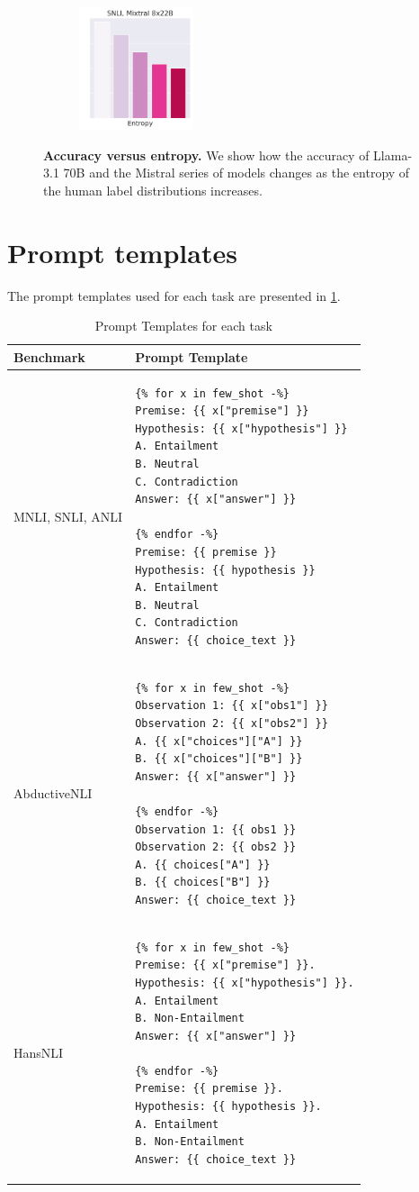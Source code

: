 \begin{figure}[t]
    \begin{subfigure}[b]{0.23\textwidth}
        \includegraphics[height=3.6cm]{figures/appendix/entropy_acc_snli_8x22B}
    \end{subfigure}
    \caption{\textbf{Accuracy versus entropy.} We show how the accuracy of Llama-3.1 70B and the Mistral series of models changes as the entropy of the human label distributions increases.}
    \label{fig:entropy_accuracy_all}
\end{figure}

\section{Prompt templates}

The prompt templates used for each task are presented in \cref{tab:prompt_template}.

\begin{table}[t]
    \centering
    \small
    \begin{tabular}{lp{8cm}}
        \toprule
        \textbf{Benchmark} & \textbf{Prompt Template} \\
        \midrule
        MNLI, SNLI, ANLI & \begin{verbatim}
{% for x in few_shot -%}
Premise: {{ x["premise"] }}
Hypothesis: {{ x["hypothesis"] }}
A. Entailment
B. Neutral
C. Contradiction
Answer: {{ x["answer"] }}

{% endfor -%}
Premise: {{ premise }}
Hypothesis: {{ hypothesis }}
A. Entailment
B. Neutral
C. Contradiction
Answer: {{ choice_text }}
\end{verbatim} \\
\midrule
AbductiveNLI & \begin{verbatim}
{% for x in few_shot -%}
Observation 1: {{ x["obs1"] }}
Observation 2: {{ x["obs2"] }}
A. {{ x["choices"]["A"] }}
B. {{ x["choices"]["B"] }}
Answer: {{ x["answer"] }}

{% endfor -%}
Observation 1: {{ obs1 }}
Observation 2: {{ obs2 }}
A. {{ choices["A"] }}
B. {{ choices["B"] }}
Answer: {{ choice_text }}
\end{verbatim} \\
\midrule
HansNLI & \begin{verbatim}
{% for x in few_shot -%}
Premise: {{ x["premise"] }}.
Hypothesis: {{ x["hypothesis"] }}.
A. Entailment
B. Non-Entailment
Answer: {{ x["answer"] }}

{% endfor -%}
Premise: {{ premise }}.
Hypothesis: {{ hypothesis }}.
A. Entailment
B. Non-Entailment
Answer: {{ choice_text }}
\end{verbatim} \\
\bottomrule
\end{tabular}
\caption{Prompt Templates for each task}
\label{tab:prompt_template}
\end{table}

